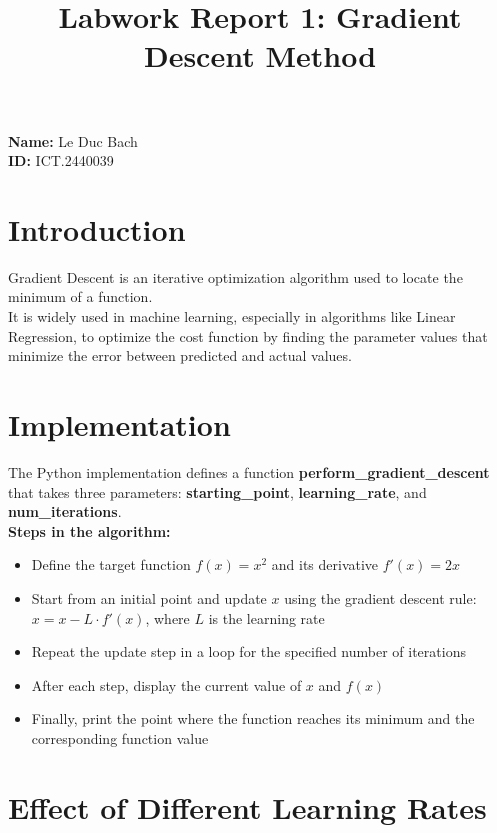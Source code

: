 \documentclass{article}
\title{Labwork Report 1: Gradient Descent Method}
\begin{document}
\maketitle

\begin{flushleft}
\textbf{Name:} Le Duc Bach \\
\textbf{ID:} ICT.2440039
\end{flushleft}

\setlength\parindent{0pt}
\section{Introduction}

Gradient Descent is an iterative optimization algorithm used to locate the minimum of a function.\\
It is widely used in machine learning, especially in algorithms like Linear Regression, to optimize the cost function by finding the parameter values that minimize the error between predicted and actual values.

\section{Implementation}

The Python implementation defines a function \textbf{perform\_gradient\_descent} that takes three parameters: \textbf{starting\_point}, \textbf{learning\_rate}, and \textbf{num\_iterations}.\\

\textbf{Steps in the algorithm:}
\begin{itemize}
    \item Define the target function $f(x) = x^2$ and its derivative $f'(x) = 2x$
    \item Start from an initial point and update $x$ using the gradient descent rule: $x = x - L \cdot f'(x)$, where $L$ is the learning rate
    \item Repeat the update step in a loop for the specified number of iterations
    \item After each step, display the current value of $x$ and $f(x)$
    \item Finally, print the point where the function reaches its minimum and the corresponding function value
\end{itemize}

\section{Effect of Different Learning Rates}
\end{document}
